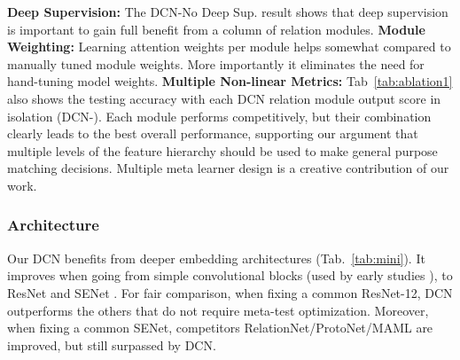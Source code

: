 \documentclass[conference]{IEEEtran}
\def\modelnameshort{DCN}
\newcommand{\cut}[1]{}
\begin{document}
\cut{\textbf{Parameterized Gaussian Noise Regularization:} Comparing \modelnameshort{} and \modelnameshort{}-No Noise, we can see that this brings over 2\% improvement.} \cut{\textbf{Retraining:} The impact of re-training on the combined training and validation set is visible by comparing the entries with \modelnameshort{}-No Retrain. Retraining provides a similar 2\% margin, and this is complementary to the noise.} \textbf{Deep Supervision:} The \modelnameshort{}-No Deep Sup. result shows that deep supervision is important to gain full benefit from a column of relation modules.  \textbf{Module Weighting:} Learning attention weights per module helps somewhat compared to manually tuned module weights. More importantly it eliminates the need for hand-tuning model weights. \textbf{Multiple Non-linear Metrics:} Tab~\ref{tab:ablation1} also shows the testing accuracy with each \modelnameshort{} relation module output score  in isolation (\modelnameshort{}-). Each module performs competitively, but their combination clearly leads to the best overall performance, supporting our argument that multiple levels of the feature hierarchy should be used to make general purpose matching decisions. Multiple meta learner design is a creative contribution of our work. 

\subsubsection{Architecture}
Our \modelnameshort{} benefits from deeper embedding architectures (Tab.~\ref{tab:mini}). It improves when going from simple convolutional blocks (used by early studies \cite{finn2017model,snell2017prototypical,yang2018learning}), to ResNet \cite{he2016deep} and SENet \cite{hu2018senet}. For fair comparison, when fixing a common ResNet-12, \modelnameshort{} outperforms the others that do not require meta-test optimization. Moreover, when fixing a common SENet, competitors RelationNet/ProtoNet/MAML are improved, but still surpassed by \modelnameshort{}.  

\cut{Our idea of multiple metrics can be applied to other metric learning methods. We extended Prototypical Nets to use four (linear) metrics instead of one, analogous to our use of four comparison modules in \modelnameshort{}. The results in Tab~\ref{tab:mini} (bottom) show that while multiple metrics also improve the performance of Prototypical Nets, \modelnameshort{} is still much better.}  
\end{document}
